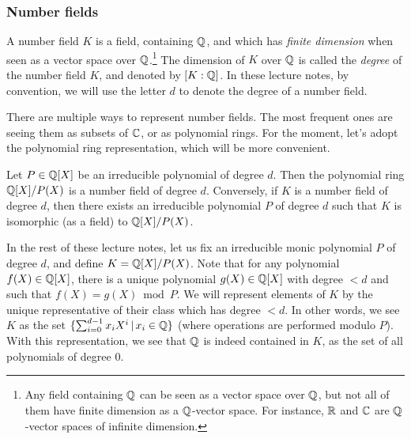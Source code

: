\subsubsection{Number fields}

A number field $K$ is a field, containing $\mathbb{Q}$, and which has \emph{finite dimension} when seen as a vector space over $\mathbb{Q}$.\footnote{Any field containing $\mathbb{Q}$ can be seen as a vector space over $\mathbb{Q}$, but not all of them have finite dimension as a $\mathbb{Q}$-vector space. For instance, $\mathbb{R}$ and $\mathbb{C}$ are $\mathbb{Q}$-vector spaces of infinite dimension.} The dimension of $K$ over $\mathbb{Q}$ is called the \emph{degree} of the number field $K$, and denoted by $[K:\mathbb{Q}]$. In these lecture notes, by convention, we will use the letter $d$ to denote the degree of a number field.

There are multiple ways to represent number fields. The most frequent ones are seeing them as subsets of $\mathbb{C}$, or as polynomial rings. For the moment, let's adopt the polynomial ring representation, which will be more convenient.

\begin{lemma}
\label{le:nb-field-eq-def}
Let $P \in \mathbb{Q}[X]$ be an irreducible polynomial of degree $d$. Then the polynomial ring $\mathbb{Q}[X]/P(X)$ is a number field of degree $d$.
Conversely, if $K$ is a number field of degree $d$, then there exists an irreducible polynomial $P$ of degree $d$ such that $K$ is isomorphic (as a field) to $\mathbb{Q}[X]/P(X)$.
\end{lemma}

In the rest of these lecture notes, let us fix an irreducible monic polynomial $P$ of degree $d$, and define $K = \mathbb{Q}[X]/P(X)$. Note that for any polynomial $f(X) \in \mathbb{Q}[X]$, there is a unique polynomial $g(X) \in \mathbb{Q}[X]$ with degree $< d$ and such that $f(X) = g(X) \bmod P$. We will represent elements of $K$ by the unique representative of their class which has degree $< d$. In other words, we see $K$ as the set $\{\sum_{i = 0}^{d-1} x_i X^i\,|\, x_i \in \mathbb{Q}\}$ (where operations are performed modulo $P$). With this representation, we see that $\mathbb{Q}$ is indeed contained in $K$, as the set of all polynomials of degree $0$.

